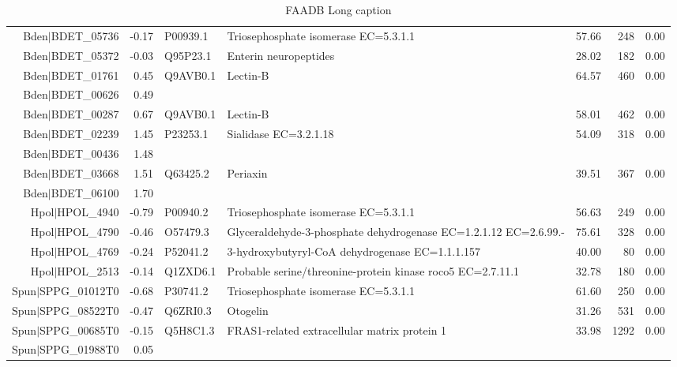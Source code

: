 \begin{table}[tbp]
\begin{tabular}{rrllrrr}
  Bden$|$BDET\_05736 & -0.17 & P00939.1 & Triosephosphate isomerase EC=5.3.1.1 & 57.66 & 248 & 0.00 \\ 
  Bden$|$BDET\_05372 & -0.03 & Q95P23.1 & Enterin neuropeptides & 28.02 & 182 & 0.00 \\ 
  Bden$|$BDET\_01761 & 0.45 & Q9AVB0.1 & Lectin-B & 64.57 & 460 & 0.00 \\ 
  Bden$|$BDET\_00626 & 0.49 &  &  &  &  &  \\ 
  Bden$|$BDET\_00287 & 0.67 & Q9AVB0.1 & Lectin-B & 58.01 & 462 & 0.00 \\ 
  Bden$|$BDET\_02239 & 1.45 & P23253.1 & Sialidase EC=3.2.1.18 & 54.09 & 318 & 0.00 \\ 
  Bden$|$BDET\_00436 & 1.48 &  &  &  &  &  \\ 
  Bden$|$BDET\_03668 & 1.51 & Q63425.2 & Periaxin & 39.51 & 367 & 0.00 \\ 
  Bden$|$BDET\_06100 & 1.70 &  &  &  &  &  \\ 
  Hpol$|$HPOL\_4940 & -0.79 & P00940.2 & Triosephosphate isomerase EC=5.3.1.1 & 56.63 & 249 & 0.00 \\ 
  Hpol$|$HPOL\_4790 & -0.46 & O57479.3 & Glyceraldehyde-3-phosphate dehydrogenase EC=1.2.1.12 EC=2.6.99.- & 75.61 & 328 & 0.00 \\ 
  Hpol$|$HPOL\_4769 & -0.24 & P52041.2 & 3-hydroxybutyryl-CoA dehydrogenase EC=1.1.1.157 & 40.00 &  80 & 0.00 \\ 
  Hpol$|$HPOL\_2513 & -0.14 & Q1ZXD6.1 & Probable serine/threonine-protein kinase roco5 EC=2.7.11.1 & 32.78 & 180 & 0.00 \\ 
  Spun$|$SPPG\_01012T0 & -0.68 & P30741.2 & Triosephosphate isomerase EC=5.3.1.1 & 61.60 & 250 & 0.00 \\ 
  Spun$|$SPPG\_08522T0 & -0.47 & Q6ZRI0.3 & Otogelin & 31.26 & 531 & 0.00 \\ 
  Spun$|$SPPG\_00685T0 & -0.15 & Q5H8C1.3 & FRAS1-related extracellular matrix protein 1 & 33.98 & 1292 & 0.00 \\ 
  Spun$|$SPPG\_01988T0 & 0.05 &  &  &  &  &  \\ 
   \hline
\hline
\end{tabular}
\caption[FAADB short caption]{FAADB Long caption} 
\label{tab:ChClat_FAADB}
\end{table}
